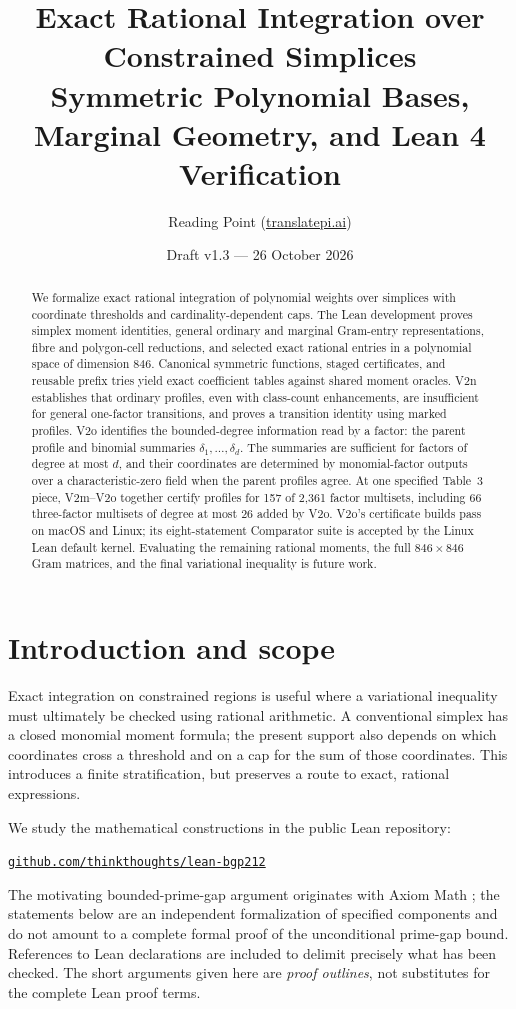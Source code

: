 \documentclass[11pt]{article}
\title{Exact Rational Integration over Constrained Simplices\\[4pt]\large Symmetric Polynomial Bases, Marginal Geometry, and Lean 4 Verification}
\author{Reading Point \texorpdfstring{(\href{https://translatepi.ai/}{translatepi.ai})}{(translatepi.ai)}}
\date{Draft v1.3 --- 26 October 2026}
\begin{document}
\maketitle
\begin{abstract}
We formalize exact rational integration of polynomial weights over simplices
with coordinate thresholds and cardinality-dependent caps. The Lean development
proves simplex moment identities, general ordinary and marginal Gram-entry
representations, fibre and polygon-cell reductions, and selected exact rational
entries in a polynomial space of dimension 846. Canonical symmetric functions,
staged certificates, and reusable prefix tries yield exact coefficient tables
against shared moment oracles. V2n establishes that ordinary profiles, even
with class-count enhancements, are insufficient for general one-factor
transitions, and proves a transition identity using marked profiles. V2o
identifies the bounded-degree information read by a factor: the parent profile
and binomial summaries $\delta_1,\ldots,\delta_d$. The summaries are sufficient
for factors of degree at most $d$, and their coordinates are determined by
monomial-factor outputs over a characteristic-zero field when the parent
profiles agree. At one specified Table~3 piece, V2m--V2o together certify
profiles for 157 of 2,361 factor multisets, including 66 three-factor
multisets of degree at most 26 added by V2o. V2o's certificate builds pass on
macOS and Linux; its eight-statement Comparator suite is accepted by the Linux
Lean default kernel. Evaluating the remaining rational moments, the full
$846\times846$ Gram matrices, and the final variational inequality is future work.
\end{abstract}

\section{Introduction and scope}
Exact integration on constrained regions is useful where a variational inequality must
ultimately be checked using rational arithmetic. A conventional simplex has a closed
monomial moment formula; the present support also depends on which coordinates cross a
threshold and on a cap for the sum of those coordinates. This introduces a finite
stratification, but preserves a route to exact, rational expressions.

We study the mathematical constructions in the public Lean repository:
\begin{center}
\href{https://github.com/thinkthoughts/lean-bgp212}{\nolinkurl{github.com/thinkthoughts/lean-bgp212}}
\end{center}
The motivating bounded-prime-gap argument originates with Axiom Math
\cite{axiom}; the statements below are an independent formalization of specified
components and do not amount to a complete formal proof of the unconditional
prime-gap bound. References to Lean declarations are included to delimit precisely
what has been checked. The short arguments given here are \emph{proof outlines}, not
substitutes for the complete Lean proof terms.
\end{document}
